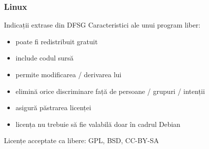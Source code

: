 \documentclass[xcolor=dvipsnames]{beamer}
\begin{document}
\begin{frame}
\frametitle{Linux}
\begin{block}
{Indicații extrase din DFSG}
Caracteristici ale unui program liber:\\
\begin{itemize}
\item poate fi redistribuit gratuit
\item include codul sursă
\item permite modificarea / derivarea lui
\item elimină orice discriminare față de persoane / grupuri / intenții
\item asigură păstrarea licenței
\item licența nu trebuie să fie valabilă doar în cadrul Debian
\end{itemize}
\end{block}
\begin{normalsize}
\hfill Licențe acceptate ca libere: GPL, BSD, CC-BY-SA
\end{normalsize}
\end{frame}
%
\end{document}
